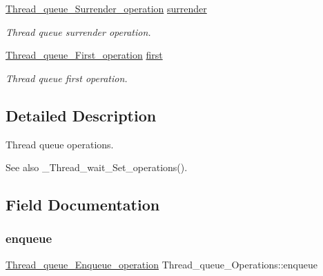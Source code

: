 \begin{DoxyCompactItemize}
\mbox{\hyperlink{group__RTEMSScoreThreadQueue_ga42e805a4c313faaddf8dc08592696574}{Thread\+\_\+queue\+\_\+\+Surrender\+\_\+operation}} \mbox{\hyperlink{structThread__queue__Operations_a13d0ee337419bccd8e33dc5800c33f42}{surrender}}
\begin{DoxyCompactList}\small\item\em Thread queue surrender operation. \end{DoxyCompactList}\item 
\mbox{\label{structThread__queue__Operations_a74797d0af7bd43fd73dbc0d26f40f927}} 
\mbox{\hyperlink{group__RTEMSScoreThreadQueue_gacd3bee122e35cf14e0ed8680256db439}{Thread\+\_\+queue\+\_\+\+First\+\_\+operation}} \mbox{\hyperlink{structThread__queue__Operations_a74797d0af7bd43fd73dbc0d26f40f927}{first}}
\begin{DoxyCompactList}\small\item\em Thread queue first operation. \end{DoxyCompactList}\end{DoxyCompactItemize}


\subsection{Detailed Description}
Thread queue operations. 

\begin{DoxySeeAlso}{See also}
\+\_\+\+Thread\+\_\+wait\+\_\+\+Set\+\_\+operations(). 
\end{DoxySeeAlso}


\subsection{Field Documentation}
\mbox{\label{structThread__queue__Operations_af30c12fd453a4d80b242dec356d5e331}} 
\subsubsection{\texorpdfstring{enqueue}{enqueue}}
{\footnotesize\ttfamily \mbox{\hyperlink{group__RTEMSScoreThreadQueue_ga1d111ef0f5c9457f7e17a217fc7558cd}{Thread\+\_\+queue\+\_\+\+Enqueue\+\_\+operation}} Thread\+\_\+queue\+\_\+\+Operations\+::enqueue}



